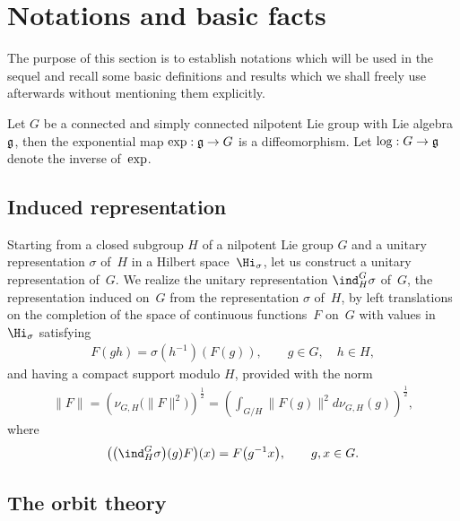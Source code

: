 \section{Notations and basic facts} \label{section2}

The purpose of this section is to establish notations which will be
used in the sequel and recall some basic def\/initions and results
which we shall freely use afterwards without mentioning them
explicitly.

 Let $G$  be a connected and simply
connected nilpotent Lie group with Lie algebra $\frak g$, then the
exponential map ${\rm exp}: \frak g \rightarrow G$ is a
dif\/feomorphism. Let $\log: G \rightarrow \frak g$
denote the inverse of~${\rm exp}$.

\subsection{Induced representation}\label{section2.1} %

Starting from a closed
subgroup $H$ of a nilpotent Lie group $G$ and a unitary
representation $\sigma$ of~$H$ in a Hilbert space~$\Hi_\sigma$, let
us construct a unitary representation of~$G$. We realize the unitary
representation $\ind_H^G\sigma$ of~$G$, the representation induced
on~$G$ from the representation $\sigma$ of~$H$, by left translations
on the completion of the space of continuous functions~$F$ on~$G$
with values in~$\Hi_\sigma$ satisfying
\begin{gather}\label{covarience}
F(gh) = \sigma(h^{-1})(F(g)),\qquad  g\in G, \quad h\in H,
\end{gather}
and having a compact support modulo $H$, provided with the norm
\begin{gather*}%
\|F\| = \left(\nu_{G, H}\big(\|F\|^2\big)\right)^{\frac{1}{2}} =
\left(\int_{G/H} \|F(g)\|^2 d\nu_{G, H}(g)\right)^{\frac{1}{2}},
\end{gather*}
where
\begin{gather*}
\big(\big(\ind_H^G\sigma\big)(g) F\big)(x) = F\big(g^{-1} x\big),\qquad g, x\in G.
\end{gather*}

\subsection{The orbit theory}\label{section2.2}

